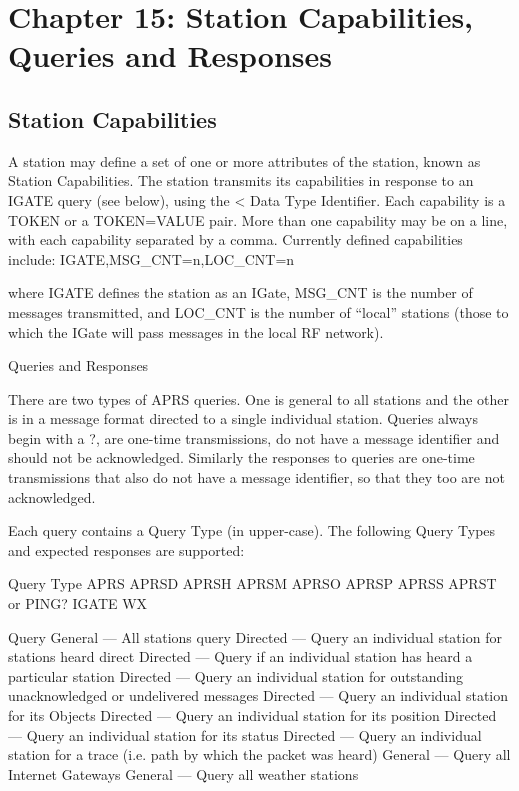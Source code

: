 \chapter{Chapter 15: Station Capabilities, Queries and Responses}

\section{Station Capabilities}

A station may define a set of one or more attributes of the station, known as
Station Capabilities. The station transmits its capabilities in response to an
IGATE query (see below), using the < Data Type Identifier.
Each capability is a TOKEN or a TOKEN=VALUE pair. More than one
capability may be on a line, with each capability separated by a comma.
Currently defined capabilities include:
IGATE,MSG_CNT=n,LOC_CNT=n

where IGATE defines the station as an IGate, MSG_CNT is the number of
messages transmitted, and LOC_CNT is the number of “local” stations (those
to which the IGate will pass messages in the local RF network).

Queries and
Responses

There are two types of APRS queries. One is general to all stations and the
other is in a message format directed to a single individual station.
Queries always begin with a ?, are one-time transmissions, do not have a
message identifier and should not be acknowledged. Similarly the responses
to queries are one-time transmissions that also do not have a message
identifier, so that they too are not acknowledged.

Each query contains a Query Type (in upper-case). The following Query
Types and expected responses are supported:

Query Type
APRS
APRSD
APRSH
APRSM
APRSO
APRSP
APRSS
APRST or
PING?
IGATE
WX

Query
General — All stations query
Directed — Query an individual station for
stations heard direct
Directed — Query if an individual station has
heard a particular station
Directed — Query an individual station for
outstanding unacknowledged or undelivered
messages
Directed — Query an individual station for its
Objects
Directed — Query an individual station for its
position
Directed — Query an individual station for its
status
Directed — Query an individual station for a
trace (i.e. path by which the packet was heard)
General — Query all Internet Gateways
General — Query all weather stations

